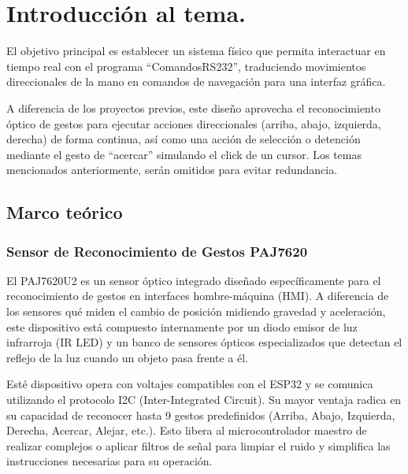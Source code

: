 \documentclass[conference]{IEEEtran}
\begin{document}

\section{Introducción al tema.}

El objetivo principal es establecer un sistema físico que permita interactuar en tiempo real con el programa “ComandosRS232”, traduciendo movimientos direccionales de la mano en comandos de navegación para una interfaz gráfica.

A diferencia de los proyectos previos, este diseño aprovecha el reconocimiento óptico de gestos para ejecutar acciones direccionales (arriba, abajo, izquierda, derecha) de forma continua, así como una acción de selección o detención mediante el gesto de ``acercar'' simulando el click de un cursor. Los temas mencionados anteriormente, serán omitidos para evitar redundancia.

 \subsection{Marco teórico}
  \subsubsection{Sensor de Reconocimiento de Gestos PAJ7620}
  El PAJ7620U2 es un sensor óptico integrado diseñado específicamente para el reconocimiento de gestos en interfaces hombre-máquina (HMI). A diferencia de los sensores qué miden el cambio de posición midiendo gravedad y aceleración, este dispositivo está compuesto internamente por un diodo emisor de luz infrarroja (IR LED) y un banco de sensores ópticos especializados que detectan el reflejo de la luz cuando un objeto pasa frente a él.

Esté dispositivo opera con voltajes compatibles con el ESP32 y se comunica utilizando el protocolo I2C (Inter-Integrated Circuit). Su mayor ventaja radica en su capacidad de reconocer hasta 9 gestos predefinidos (Arriba, Abajo, Izquierda, Derecha, Acercar, Alejar, etc.). Esto libera al microcontrolador maestro de realizar complejos o aplicar filtros de señal para limpiar el ruido y simplifica las instrucciones necesarias para su operación.
\end{document}
